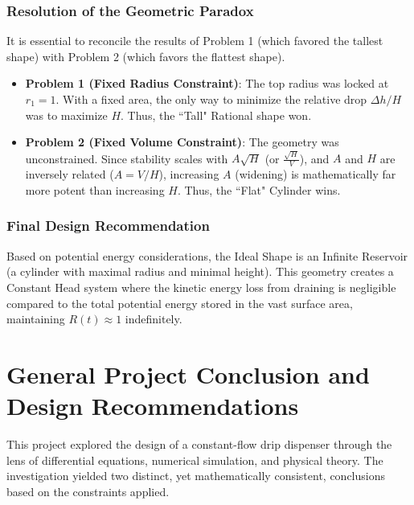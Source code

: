 \documentclass[a4paper, 12pt]{article}
\begin{document}
\subsubsection{Resolution of the Geometric Paradox}
It is essential to reconcile the results of Problem 1 (which favored the tallest shape) with Problem 2 (which favors the flattest shape).
\begin{itemize}
    \item \textbf{Problem 1 (Fixed Radius Constraint)}: The top radius was locked at $r_1 = 1$. With a fixed area, the only way to minimize the relative drop $\Delta h / H$ was to maximize $H$. Thus, the ``Tall" Rational shape won.
    \item \textbf{Problem 2 (Fixed Volume Constraint)}: The geometry was unconstrained. Since stability scales with $A\sqrt{H}$ (or $\frac{\sqrt{H}}{V}$), and $A$ and $H$ are inversely related ($A=V/H$), increasing $A$ (widening) is mathematically far more potent than increasing $H$. Thus, the ``Flat" Cylinder wins.
\end{itemize}

\subsubsection{Final Design Recommendation}
Based on potential energy considerations, the Ideal Shape is an Infinite Reservoir (a cylinder with maximal radius and minimal height). This geometry creates a Constant Head system where the kinetic energy loss from draining is negligible compared to the total potential energy stored in the vast surface area, maintaining $R(t) \approx 1$ indefinitely.

\section{General Project Conclusion and Design Recommendations}

This project explored the design of a constant-flow drip dispenser through the lens of differential equations, numerical simulation, and physical theory. The investigation yielded two distinct, yet mathematically consistent, conclusions based on the constraints applied.
\end{document}
